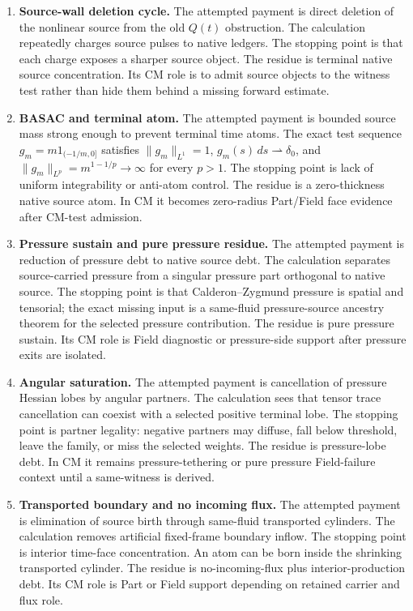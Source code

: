 \begin{enumerate}[leftmargin=*,label=\arabic*.]
\item \textbf{Source-wall deletion cycle.}
The attempted payment is direct deletion of the nonlinear source from the
old \(Q(t)\) obstruction.
The calculation repeatedly charges source pulses to native ledgers.
The stopping point is that each charge exposes a sharper source object.
The residue is terminal native source concentration.
Its CM role is to admit source objects to the witness test rather than hide
them behind a missing forward estimate.

\item \textbf{BASAC and terminal atom.}
The attempted payment is bounded source mass strong enough to prevent terminal
time atoms.
The exact test sequence \(g_m=m1_{(-1/m,0]}\) satisfies
\(\|g_m\|_{L^1}=1\), \(g_m(s)\,ds\rightharpoonup\delta_0\), and
\(\|g_m\|_{L^p}=m^{1-1/p}\to\infty\) for every \(p>1\).
The stopping point is lack of uniform integrability or anti-atom control.
The residue is a zero-thickness native source atom.  In CM it becomes
zero-radius Part/Field face evidence after CM-test admission.

\item \textbf{Pressure sustain and pure pressure residue.}
The attempted payment is reduction of pressure debt to native source debt.
The calculation separates source-carried pressure from a singular pressure
part orthogonal to native source.
The stopping point is that Calderon--Zygmund pressure is spatial and tensorial;
the exact missing input is a same-fluid pressure-source ancestry theorem for
the selected pressure contribution.
The residue is pure pressure sustain.
Its CM role is Field diagnostic or pressure-side support after pressure exits
are isolated.

\item \textbf{Angular saturation.}
The attempted payment is cancellation of pressure Hessian lobes by angular
partners.
The calculation sees that tensor trace cancellation can coexist with a selected
positive terminal lobe.
The stopping point is partner legality: negative partners may diffuse, fall
below threshold, leave the family, or miss the selected weights.
The residue is pressure-lobe debt.  In CM it remains pressure-tethering or pure
pressure Field-failure context until a same-witness is derived.

\item \textbf{Transported boundary and no incoming flux.}
The attempted payment is elimination of source birth through same-fluid
transported cylinders.
The calculation removes artificial fixed-frame boundary inflow.
The stopping point is interior time-face concentration.
An atom can be born inside the shrinking transported cylinder.
The residue is no-incoming-flux plus interior-production debt.
Its CM role is Part or Field support depending on retained carrier and
flux role.


\end{enumerate}

